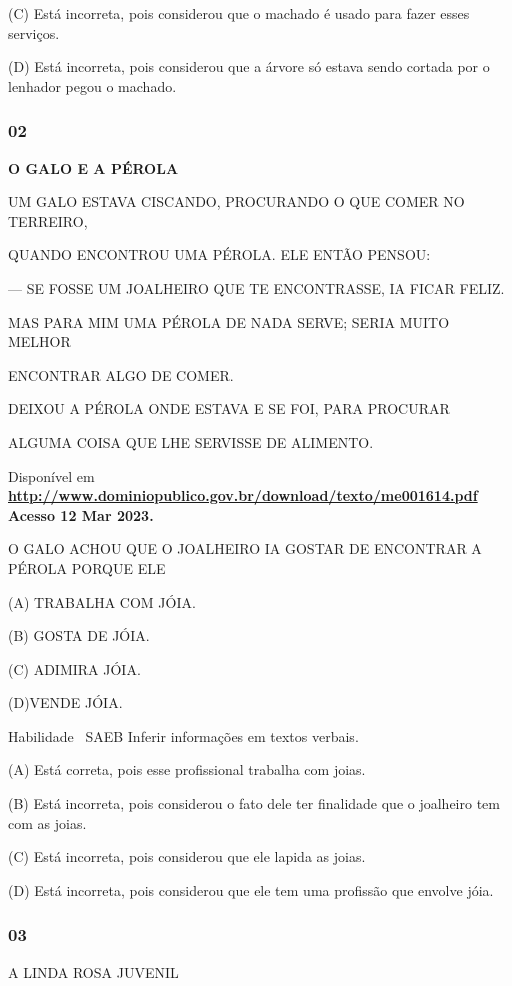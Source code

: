 (C) Está incorreta, pois considerou que o machado é usado para fazer
esses serviços.

(D) Está incorreta, pois considerou que a árvore só estava sendo cortada
por o lenhador pegou o machado.

\subsubsection{02}\label{section-79}

\textbf{O GALO E A PÉROLA}

UM GALO ESTAVA CISCANDO, PROCURANDO O QUE COMER NO TERREIRO,

QUANDO ENCONTROU UMA PÉROLA. ELE ENTÃO PENSOU:

--- SE FOSSE UM JOALHEIRO QUE TE ENCONTRASSE, IA FICAR FELIZ.

MAS PARA MIM UMA PÉROLA DE NADA SERVE; SERIA MUITO MELHOR

ENCONTRAR ALGO DE COMER.

DEIXOU A PÉROLA ONDE ESTAVA E SE FOI, PARA PROCURAR

ALGUMA COISA QUE LHE SERVISSE DE ALIMENTO.

Disponível em
\textbf{\url{http://www.dominiopublico.gov.br/download/texto/me001614.pdf}
Acesso 12 Mar 2023.}

O GALO ACHOU QUE O JOALHEIRO IA GOSTAR DE ENCONTRAR A PÉROLA PORQUE ELE

(A) TRABALHA COM JÓIA.

(B) GOSTA DE JÓIA.

(C) ADIMIRA JÓIA.

(D)VENDE JÓIA.

\protect\hypertarget{_Hlk129237824}{}{}Habilidade ~SAEB Inferir
informações em textos verbais.

\protect\hypertarget{_Hlk129241484}{}{}(A) Está correta, pois esse
profissional trabalha com joias.

(B) Está incorreta, pois considerou o fato dele ter finalidade que o
joalheiro tem com as joias.

(C) Está incorreta, pois considerou que ele lapida as joias.

(D) Está incorreta, pois considerou que ele tem uma profissão que
envolve jóia.

\subsubsection{03 }\label{section-80}

A LINDA ROSA JUVENIL

